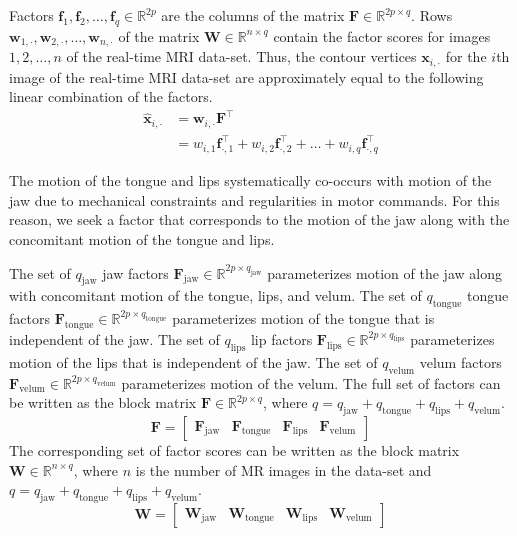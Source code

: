 \documentclass[preprint]{JASAnew}\usepackage[]{graphicx}\usepackage[]{color}
\begin{document}
Factors $\mathbf{f}_1, \mathbf{f}_2, \ldots, \mathbf{f}_q \in \mathbb{R}^{2p}$ are the columns of the matrix $\mathbf{F} \in \mathbb{R}^{2p\times q}$. 
%
Rows $\mathbf{w}_{1,\cdot},\mathbf{w}_{2,\cdot},\ldots,\mathbf{w}_{n,\cdot}$ of the matrix $\mathbf{W} \in \mathbb{R}^{n\times q}$ contain the factor scores for images $1,2,\ldots,n$ of the real-time MRI data-set. 
%
Thus, the contour vertices $\mathbf{x}_{i,\cdot}$ for the $i$th image of the real-time MRI data-set are approximately equal to the following linear combination of the factors. 
%
\begin{align}
\label{eq:linearcombo}
\mathbf{\hat{x}}_{i,\cdot}
 &=
  \mathbf{w}_{i,\cdot} \mathbf{F}^\intercal \\
 &=
  w_{i,1} \mathbf{f}_{\cdot,1}^\intercal
  + w_{i,2} \mathbf{f}_{\cdot,2}^\intercal
  + \ldots
  + w_{i,q} \mathbf{f}_{\cdot,q}^\intercal
\end{align}




The motion of the tongue and lips systematically co-occurs with motion of the jaw due to mechanical constraints and regularities in motor commands. For this reason, we seek a factor that corresponds to the motion of the jaw along with the concomitant motion of the tongue and lips.


The set of $q_\text{jaw}$ jaw factors $\mathbf{F}_\text{jaw} \in \mathbb{R}^{2p\times q_\text{jaw}}$ parameterizes motion of the jaw along with concomitant motion of the tongue, lips, and velum.
%
The set of $q_\text{tongue}$ tongue factors $\mathbf{F}_\text{tongue} \in \mathbb{R}^{2p\times q_\text{tongue}}$ parameterizes motion of the tongue that is independent of the jaw. 
%
The set of $q_\text{lips}$ lip factors $\mathbf{F}_\text{lips} \in \mathbb{R}^{2p\times q_\text{lips}}$ parameterizes motion of the lips that is independent of the jaw.
%
The set of $q_\text{velum}$ velum factors $\mathbf{F}_\text{velum} \in \mathbb{R}^{2p\times q_\text{velum}}$ parameterizes motion of the velum.
%
The full set of factors can be written as the block matrix $\mathbf{F} \in \mathbb{R}^{2p\times q}$, where $q=q_\text{jaw}+q_\text{tongue}+q_\text{lips}+q_\text{velum}$. 
% 
\begin{equation}
\label{eq:Fblock}
\mathbf{F} = 
\left[
\begin{array}{c|c|c|c}
\mathbf{F}_\text{jaw} 
& \mathbf{F}_\text{tongue}
& \mathbf{F}_\text{lips}
& \mathbf{F}_\text{velum}
\end{array}
\right]
\end{equation}
%
The corresponding set of factor scores can be written as the block matrix $\mathbf{W} \in \mathbb{R}^{n\times q}$, where $n$ is the number of MR images in the data-set and $q=q_\text{jaw}+q_\text{tongue}+q_\text{lips}+q_\text{velum}$. 
% 
\begin{equation}
\label{eq:Wblock}
\mathbf{W} = 
\left[
\begin{array}{c|c|c|c}
\mathbf{W}_\text{jaw} 
& \mathbf{W}_\text{tongue}
& \mathbf{W}_\text{lips}
& \mathbf{W}_\text{velum}
\end{array}
\right]
\end{equation}
\end{document}
